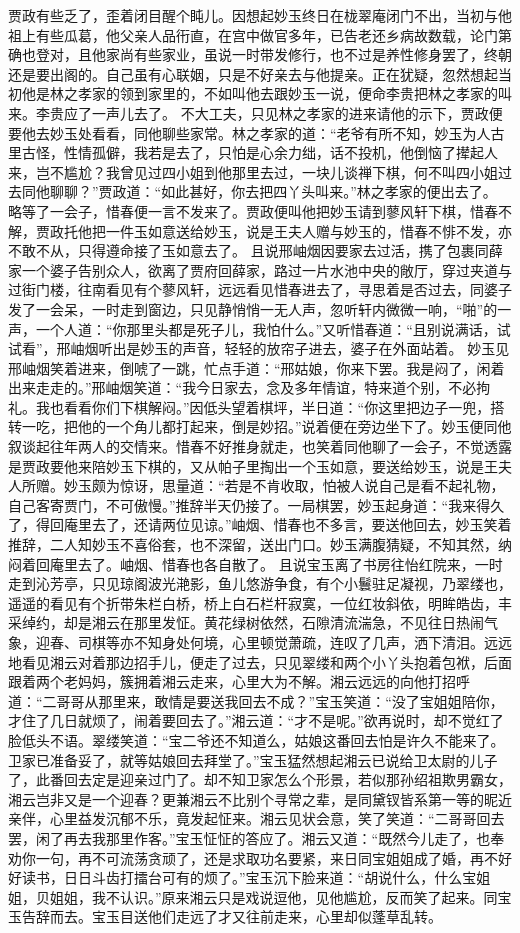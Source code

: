 \documentclass[12pt,oneside]{book}
\begin{document}
贾政有些乏了，歪着闭目醒个盹儿。因想起妙玉终日在栊翠庵闭门不出，当初与他祖上有些瓜葛，他父亲人品衎直，在宫中做官多年，已告老还乡病故数载，论门第确也登对，且他家尚有些家业，虽说一时带发修行，也不过是养性修身罢了，终朝还是要出阁的。自己虽有心联姻，只是不好亲去与他提亲。正在犹疑，忽然想起当初他是林之孝家的领到家里的，不如叫他去跟妙玉一说，便命李贵把林之孝家的叫来。李贵应了一声儿去了。
不大工夫，只见林之孝家的进来请他的示下，贾政便要他去妙玉处看看，同他聊些家常。林之孝家的道：“老爷有所不知，妙玉为人古里古怪，性情孤僻，我若是去了，只怕是心余力绌，话不投机，他倒恼了撵起人来，岂不尴尬？我曾见过四小姐到他那里去过，一块儿谈禅下棋，何不叫四小姐过去同他聊聊？”贾政道：“如此甚好，你去把四丫头叫来。”林之孝家的便出去了。
略等了一会子，惜春便一言不发来了。贾政便叫他把妙玉请到蓼风轩下棋，惜春不解，贾政托他把一件玉如意送给妙玉，说是王夫人赠与妙玉的，惜春不悱不发，亦不敢不从，只得遵命接了玉如意去了。
且说邢岫烟因要家去过活，携了包裹同薛家一个婆子告别众人，欲离了贾府回薛家，路过一片水池中央的敞厅，穿过夹道与过街门楼，往南看见有个蓼风轩，远远看见惜春进去了，寻思着是否过去，同婆子发了一会呆，一时走到窗边，只见静悄悄一无人声，忽听轩内微微一响，“啪”的一声，一个人道：“你那里头都是死子儿，我怕什么。”又听惜春道：“且别说满话，试试看”，邢岫烟听出是妙玉的声音，轻轻的放帘子进去，婆子在外面站着。
妙玉见邢岫烟笑着进来，倒唬了一跳，忙点手道：“邢姑娘，你来下罢。我是闷了，闲着出来走走的。”邢岫烟笑道：“我今日家去，念及多年情谊，特来道个别，不必拘礼。我也看看你们下棋解闷。”因低头望着棋坪，半日道：“你这里把边子一兜，搭转一吃，把他的一个角儿都打起来，倒是妙招。”说着便在旁边坐下了。妙玉便同他叙谈起往年两人的交情来。惜春不好推身就走，也笑着同他聊了一会子，不觉透露是贾政要他来陪妙玉下棋的，又从帕子里掏出一个玉如意，要送给妙玉，说是王夫人所赠。妙玉颇为惊讶，思量道：“若是不肯收取，怕被人说自己是看不起礼物，自己客寄贾门，不可傲慢。”推辞半天仍接了。一局棋罢，妙玉起身道：“我来得久了，得回庵里去了，还请两位见谅。”岫烟、惜春也不多言，要送他回去，妙玉笑着推辞，二人知妙玉不喜俗套，也不深留，送出门口。妙玉满腹猜疑，不知其然，纳闷着回庵里去了。岫烟、惜春也各自散了。
且说宝玉离了书房往怡红院来，一时走到沁芳亭，只见琼阁波光滟影，鱼儿悠游争食，有个小鬟驻足凝视，乃翠缕也，遥遥的看见有个折带朱栏白桥，桥上白石栏杆寂寞，一位红妆斜依，明眸皓齿，丰采绰约，却是湘云在那里发怔。黄花绿树依然，石隙清流湍急，不见往日热闹气象，迎春、司棋等亦不知身处何境，心里顿觉萧疏，连叹了几声，洒下清泪。远远地看见湘云对着那边招手儿，便走了过去，只见翠缕和两个小丫头抱着包袱，后面跟着两个老妈妈，簇拥着湘云走来，心里大为不解。湘云远远的向他打招呼道：“二哥哥从那里来，敢情是要送我回去不成？”宝玉笑道：“没了宝姐姐陪你，才住了几日就烦了，闹着要回去了。”湘云道：“才不是呢。”欲再说时，却不觉红了脸低头不语。翠缕笑道：“宝二爷还不知道么，姑娘这番回去怕是许久不能来了。卫家已准备妥了，就等姑娘回去拜堂了。”宝玉猛然想起湘云已说给卫太尉的儿子了，此番回去定是迎亲过门了。却不知卫家怎么个形景，若似那孙绍祖欺男霸女，湘云岂非又是一个迎春？更兼湘云不比别个寻常之辈，是同黛钗皆系第一等的昵近亲伴，心里益发沉郁不乐，竟发起怔来。湘云见状会意，笑了笑道：“二哥哥回去罢，闲了再去我那里作客。”宝玉怔怔的答应了。湘云又道：“既然今儿走了，也奉劝你一句，再不可流荡贪顽了，还是求取功名要紧，来日同宝姐姐成了婚，再不好好读书，日日斗齿打擂台可有的烦了。”宝玉沉下脸来道：“胡说什么，什么宝姐姐，贝姐姐，我不认识。”原来湘云只是戏说逗他，见他尴尬，反而笑了起来。同宝玉告辞而去。宝玉目送他们走远了才又往前走来，心里却似蓬草乱转。
\end{document}
